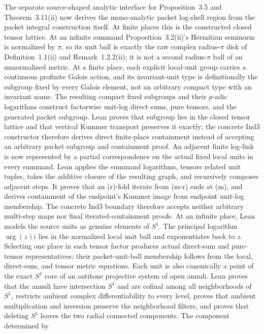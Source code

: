 \documentclass[11pt]{article}
\theoremstyle{plain}
\theoremstyle{definition}
\theoremstyle{remark}
\begin{document}
The separate source-shaped analytic interface for Proposition~3.5 and
Theorem~3.11(ii) now derives the mono-analytic packet log-shell region from the
packet integral construction itself.  At finite places this is the constructed
closed tensor lattice.  At an infinite summand Proposition~3.2(ii)'s Hermitian
seminorm is normalized by \(\pi\), so its unit ball is exactly the raw complex
radius-\(\pi\) disk of Definition~1.1(ii) and Remark~1.2.2(ii); it is not a
second radius-\(\pi\) ball of an unnormalized metric.  At a finite
place, each explicit local-unit group carries a continuous profinite Galois
action, and its invariant-unit type is definitionally the subgroup fixed by
every Galois element, not an arbitrary compact type with an invariant name.
The resulting compact fixed subgroups and their \(p\)-adic logarithms construct
factorwise unit-log direct sums, pure tensors, and the generated packet
subgroup.  Lean proves that subgroup lies in the closed
tensor lattice and that vertical Kummer transport preserves it exactly; the
concrete Ind3 constructor therefore derives direct finite-place containment
instead of accepting an arbitrary packet subgroup and containment proof.  An
adjacent finite log-link is now represented by a partial correspondence on the
actual fixed local units in every summand.  Lean applies the summand logarithms,
tensors related unit tuples, takes the additive closure of the resulting graph,
and recursively composes adjacent steps.  It proves that an (r)-fold iterate
from (m-r) ends at (m), and derives containment of the endpoint's Kummer
image from endpoint unit-log membership.  The concrete Ind3 boundary therefore
accepts neither arbitrary multi-step maps nor final iterated-containment proofs.
At an infinite place, Lean models the source units as genuine elements of
\(S^1\).  The principal logarithm \(\arg(z)i\) lies in the normalized local
unit ball and exponentiates back to \(z\).  Selecting one place in each tensor
factor produces actual direct-sum and pure-tensor representatives; their
packet-unit-ball membership follows from the local, direct-sum, and tensor
metric equations.  Each unit is also canonically a point of the exact \(S^1\)
core of an antitone projective system of open annuli.  Lean proves that the
annuli have intersection \(S^1\) and are cofinal among all neighborhoods of
\(S^1\), restricts ambient complex differentiability to every level, proves
that ambient multiplication and inversion preserve the neighborhood filters,
and proves that deleting \(S^1\) leaves the two radial connected components.
The component determined by
\end{document}
